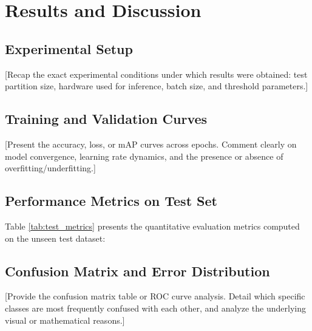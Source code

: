 \chapter{Results and Discussion}

\section{Experimental Setup}
[Recap the exact experimental conditions under which results were obtained: test partition size, hardware used for inference, batch size, and threshold parameters.]

\section{Training and Validation Curves}
[Present the accuracy, loss, or mAP curves across epochs. Comment clearly on model convergence, learning rate dynamics, and the presence or absence of overfitting/underfitting.]

\section{Performance Metrics on Test Set}
Table \ref{tab:test_metrics} presents the quantitative evaluation metrics computed on the unseen test dataset:

\begin{table}[htbp]
\centering
\caption{Performance metrics on the test dataset}
\label{tab:test_metrics}
\vspace{0.2cm}
\end{table}

\section{Confusion Matrix and Error Distribution}
[Provide the confusion matrix table or ROC curve analysis. Detail which specific classes are most frequently confused with each other, and analyze the underlying visual or mathematical reasons.]

